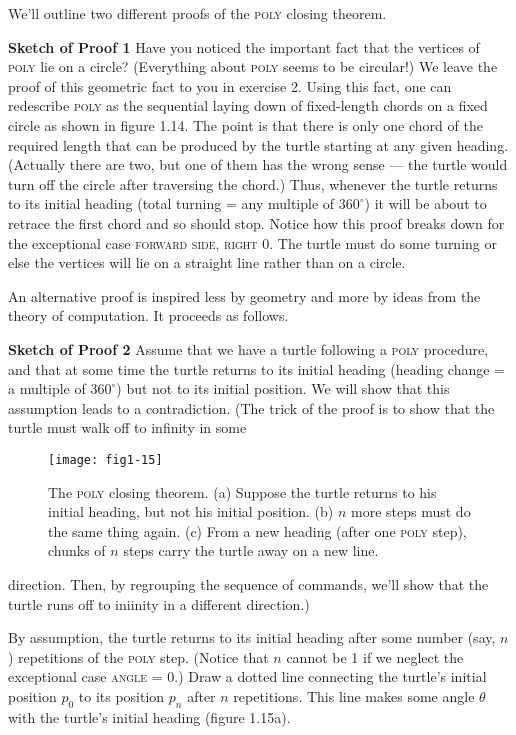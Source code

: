 \documentclass{book}
\begin{document}
We'll outline two different proofs of the \textsc{poly} closing theorem.

\textbf{Sketch of Proof 1} Have you noticed the important fact that the vertices
of \textsc{poly} lie on a circle? (Everything about \textsc{poly} seems to be circular!) We leave the proof of this geometric fact to you in exercise 2. Using this fact, one can redescribe \textsc{poly} as the sequential laying down of fixed-length chords on a fixed circle as shown in figure 1.14. The point is that
there is only one chord of the required length that can be produced by
the turtle starting at any given heading. (Actually there are two, but
one of them has the wrong sense --- the turtle would turn off the circle
after traversing the chord.) Thus, whenever the turtle returns to its
initial heading (total turning = any multiple of $360^{\circ}$) it will be about to
retrace the first chord and so should stop. Notice how this proof breaks
down for the exceptional case \textsc{forward side}, \textsc{right 0}. The turtle must
do some turning or else the vertices will lie on a straight line rather than
on a circle.

An alternative proof is inspired less by geometry and more by ideas
from the theory of computation. It proceeds as follows.

\textbf{Sketch of Proof 2} Assume that we have a turtle following a \textsc{poly} procedure, and that at some time the turtle returns to its initial heading
(heading change = a multiple of $360^{\circ}$) but not to its initial position. We
will show that this assumption leads to a contradiction. (The trick of
the proof is to show that the turtle must walk off to infinity in some

\begin{figure}
\begin{center}
\texttt{[image: fig1-15]}
\caption{The \textsc{poly} closing theorem. (a) Suppose the turtle returns to his initial heading, but not his initial position. (b) $n$ more steps must do the same thing again. (c) From a new heading (after one \textsc{poly} step), chunks of $n$ steps carry the turtle away on a new line.}
\end{center}
\end{figure}

direction. Then, by regrouping the sequence of commands, we'll show
that the turtle runs off to iniinity in a different direction.)

\indent
By assumption, the turtle returns to its initial heading after some
number (say, $n$) repetitions of the \textsc{poly} step. (Notice that $n$ cannot
be 1 if we neglect the exceptional case \textsc{angle} = 0.) Draw a dotted
line connecting the turtle's initial position $p_0$ to its position $p_n$ after $n$
repetitions. This line makes some angle $\theta$ with the turtle's initial heading
(figure 1.15a).
\end{document}
